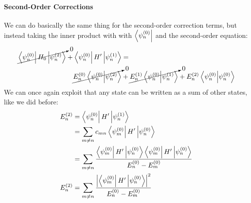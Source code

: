 \documentclass[a4paper]{article}
\begin{document}
\paragraph{Second-Order Corrections}
We can do basically the same thing for the second-order correction terms, but
instead taking the inner product with with $\left\langle \psi_n^{(0)} \right\rvert$ and the
second-order equation:
\begin{align*}
	\cancelto{0}{
	\left\langle \psi_n^{(0)} \right\rvert H_0 \left\lvert \psi_n^{(2)}\right\rangle} +
	\left\langle \psi_n^{(0)} \right\rvert H'  \left\lvert \psi_n^{(1)}\right\rangle  &=\\
	\cancelto{0}{
	E_n^{(0)} \left\langle \psi_n^{(0)}\middle\vert \psi_n^{(2)} \right\rangle} &+
	\cancelto{0}{
	E_n^{(1)} \left\langle \psi_n^{(0)}\middle\vert \psi_n^{(1)} \right\rangle}  +
	E_n^{(2)} \left\langle \psi_n^{(0)}\middle\vert \psi_n^{(0)} \right\rangle
\end{align*}
We can once again exploit that any state can be written as a sum of other
states, like we did before:
\begin{align*}
	E_n^{(2)} &= \left\langle \psi_n^{(0)} \right\rvert H' \left\lvert \psi_n^{(1)}\right\rangle\\
		  &= \sum_{m\neq n} c_{mn}
		     \left\langle \psi_m^{(0)} \right\rvert H' \left\lvert \psi_n^{(0)}\right\rangle\\
		  &= \sum_{m\neq n} \frac{
		     \left\langle \psi_m^{(0)} \right\rvert H' \left\lvert \psi_n^{(0)}\right\rangle
		     \left\langle \psi_m^{(0)} \right\rvert H' \left\lvert \psi_n^{(0)}\right\rangle}
		     {E_n^{(0)} - E_m^{(0)}}\\
	E_n^{(2)} &= \sum_{m\neq n}\frac{
		\left\lvert \left\langle \psi_m^{(0)} \right\rvert H' \left\lvert \psi_n^{(0)}\right\rangle\right\rvert^2}
		{E_n^{(0)}-E_m^{(0)}}
\end{align*}
\end{document}
